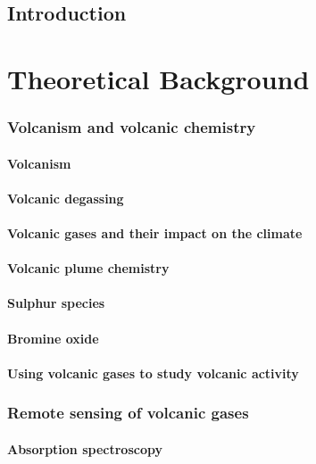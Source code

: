 \documentclass  [
  paper    = a4,
  BCOR     = 10mm,
  twoside,
  fontsize = 12pt,
  fleqn,
  toc      = bibnumbered,
  toc      = listofnumbered,
  numbers  = noendperiod,
  headings = normal,
  listof   = leveldown,
  version  = 3.03
]                                       {scrreprt}
\begin{document}
  

  \tableofcontents
	\chapter{Introduction}	
	
	\part{Theoretical Background}
	\section{Volcanism and volcanic chemistry}
	\subsection{Volcanism}
	\subsection{Volcanic degassing}
	\subsection{Volcanic gases and their impact on the climate}
	\subsection{Volcanic plume chemistry}
	\subsection{Sulphur species}
	\subsection{Bromine oxide}
	\subsection{Using volcanic gases to study volcanic activity}
	\section{Remote sensing of volcanic gases}
	\subsection{Absorption spectroscopy}
\end{document}
